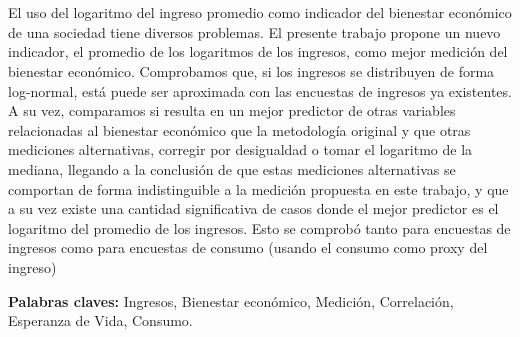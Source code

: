 \chapter*{\runtitulo}

El uso del logaritmo del ingreso promedio como indicador del bienestar económico de una sociedad tiene diversos problemas. El presente trabajo propone un nuevo indicador, el promedio de los logaritmos de los ingresos, como mejor medición del bienestar económico. Comprobamos que, si los ingresos se distribuyen de forma log-normal, está puede ser aproximada con las encuestas de ingresos ya existentes. A su vez, comparamos si resulta en un mejor predictor de otras variables relacionadas al bienestar económico que la metodología original y que otras mediciones alternativas, corregir por desigualdad o tomar el logaritmo de la mediana, llegando a la conclusión de que estas mediciones alternativas se comportan de forma indistinguible a la medición propuesta en este trabajo, y que a su vez existe una cantidad significativa de casos donde el mejor predictor es el logaritmo del promedio de los ingresos. Esto se comprobó tanto para encuestas de ingresos como para encuestas de consumo (usando el consumo como proxy del ingreso)

\noindent\textbf{Palabras claves:} Ingresos, Bienestar económico, Medición, Correlación, Esperanza de Vida, Consumo.